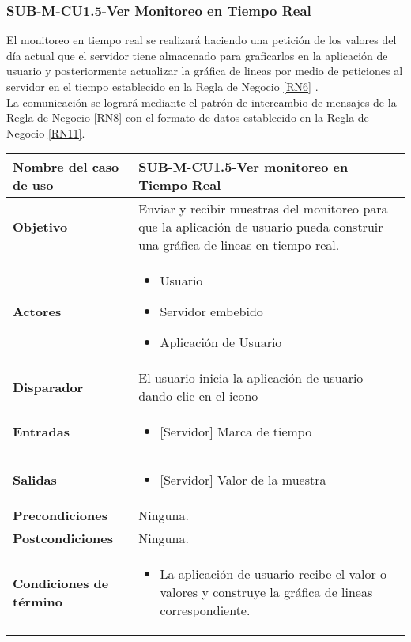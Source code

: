 \subsubsection{SUB-M-CU1.5-Ver Monitoreo en Tiempo Real}\label{SUB-M-CU1.5}
El monitoreo en tiempo real se realizará haciendo una petición de los valores del día actual que el servidor tiene almacenado para graficarlos en la aplicación de usuario y posteriormente actualizar la gráfica de lineas por medio de peticiones al servidor en el tiempo establecido en la Regla de Negocio \ref{RN6} .
\\ La comunicación se logrará mediante el patrón de intercambio de mensajes de la Regla de Negocio \ref{RN8} con el formato de datos establecido en la Regla de Negocio \ref{RN11}. 

\begin{longtable}{|J{5cm}|J{10.3cm}|}
	\hline
	\textbf{Nombre del caso de uso} &
		SUB-M-CU1.5-Ver monitoreo en Tiempo Real \\ \hline
	\textbf{Objetivo} &
		Enviar y recibir muestras del monitoreo para que la aplicación de usuario pueda construir una gráfica de lineas en tiempo real. \\ \hline
	\textbf{Actores} &
		\begin{itemize}
		    \item Usuario
			\item Servidor embebido
			\item Aplicación de Usuario
		\end{itemize} \\ \hline
	\textbf{Disparador} & 
	    El usuario inicia la aplicación de usuario dando clic en el icono \\ \hline 
	\textbf{Entradas} & 
		\begin{itemize}
				\item{[Servidor]} Marca de tiempo
		\end{itemize}\\ \hline 
	\textbf{Salidas} & 
		\begin{itemize}
			\item{[Servidor]} Valor de la muestra
		\end{itemize} \\ \hline
	\textbf{Precondiciones} &
		Ninguna. \\ \hline
	\textbf{Postcondiciones} &
		Ninguna.\\ \hline
	\textbf{Condiciones de término} & 
		\begin{itemize}
			\item La aplicación de usuario recibe el valor o valores y construye la gráfica de lineas correspondiente.

\end{itemize}
\end{longtable}
